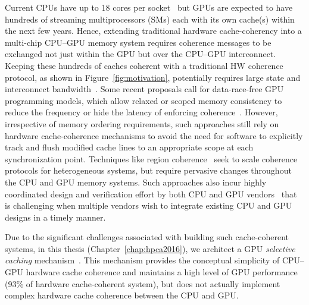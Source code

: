 Current CPUs have up to 18 cores per socket~\cite{INTELXEONE5V3} but GPUs are
expected to have hundreds of streaming multiprocessors (SMs) each with its own
cache(s) within the next few years. Hence, extending traditional hardware
cache-coherency into a multi-chip CPU--GPU memory system requires coherence
messages to be exchanged not just within the GPU but over the CPU--GPU
interconnect. Keeping these hundreds of caches coherent with a traditional HW
coherence protocol, as shown in Figure~\ref{fig:motivation}, potentially
requires large state and interconnect bandwidth~\cite{Kelm2010,johnson2011}.
Some recent proposals call for data-race-free GPU programming models, which
allow relaxed or scoped memory consistency to reduce the frequency or hide the
latency of enforcing coherence~\cite{Hechtman2014}.  However, irrespective of
memory ordering requirements, such approaches still rely on hardware
cache-coherence mechanisms to  avoid the need for software to explicitly track
and flush modified cache lines to an appropriate scope at each synchronization
point. Techniques like region coherence~\cite{Power2013} seek to scale coherence
protocols for heterogeneous systems, but require pervasive changes throughout
the CPU and GPU memory systems.  Such approaches also incur highly coordinated
design and verification effort by both CPU and GPU vendors~\cite{Hong2012} that
is challenging when multiple vendors wish to integrate existing CPU and GPU
designs in a timely manner.

Due to the significant challenges associated with building such cache-coherent
systems, in this thesis (Chapter~\ref{chap:hpca2016}), we architect a GPU
\textit{selective caching} mechanism~\cite{ref:agarwal:hpca2016}.  This
mechanism provides the conceptual simplicity of CPU--GPU hardware cache coherence
and maintains a high level of GPU performance (93\% of hardware cache-coherent
system), but does not actually implement complex hardware cache coherence
between the CPU and GPU.

